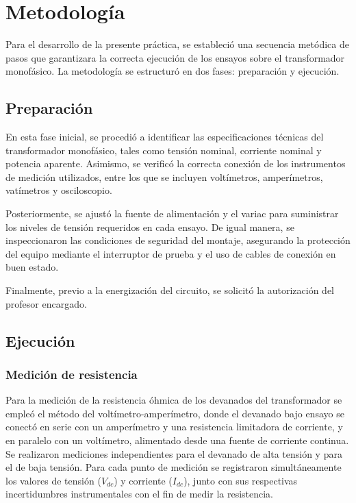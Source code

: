 \section{Metodología}

Para el desarrollo de la presente práctica, se estableció una secuencia metódica de pasos que garantizara la correcta ejecución de los ensayos sobre el transformador monofásico. La metodología se estructuró en dos fases: preparación y ejecución.

\subsection{Preparación}

En esta fase inicial, se procedió a identificar las especificaciones técnicas del transformador monofásico, tales como tensión nominal, corriente nominal y potencia aparente. Asimismo, se verificó la correcta conexión de los instrumentos de medición utilizados, entre los que se incluyen voltímetros, amperímetros, vatímetros y osciloscopio.

Posteriormente, se ajustó la fuente de alimentación y el variac para suministrar los niveles de tensión requeridos en cada ensayo. De igual manera, se inspeccionaron las condiciones de seguridad del montaje, asegurando la protección del equipo mediante el interruptor de prueba y el uso de cables de conexión en buen estado.

Finalmente, previo a la energización del circuito, se solicitó la autorización del profesor encargado. 

\subsection{Ejecución}

\subsubsection{Medición de resistencia}

Para la medición de la resistencia óhmica de los devanados del transformador se empleó el método del voltímetro-amperímetro, donde el devanado bajo ensayo se conectó en serie con un amperímetro y una resistencia limitadora de corriente, y en paralelo con un voltímetro, alimentado desde una fuente de corriente continua. Se realizaron mediciones independientes para el devanado de alta tensión y para el de baja tensión. Para cada punto de medición se registraron simultáneamente los valores de tensión ($V_{dc}$) y corriente ($I_{dc}$), junto con sus respectivas incertidumbres instrumentales con el fin de medir la resistencia. 
